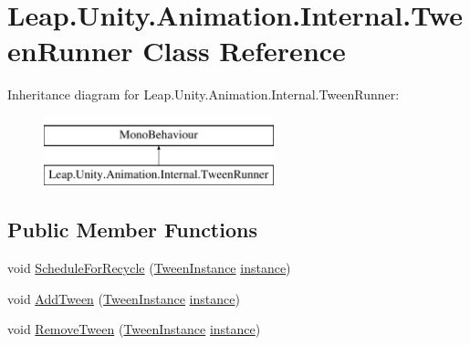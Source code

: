 \hypertarget{class_leap_1_1_unity_1_1_animation_1_1_internal_1_1_tween_runner}{}\section{Leap.\+Unity.\+Animation.\+Internal.\+Tween\+Runner Class Reference}
\label{class_leap_1_1_unity_1_1_animation_1_1_internal_1_1_tween_runner}
Inheritance diagram for Leap.\+Unity.\+Animation.\+Internal.\+Tween\+Runner\+:\begin{figure}[H]
\begin{center}
\leavevmode
\includegraphics[height=2.000000cm]{class_leap_1_1_unity_1_1_animation_1_1_internal_1_1_tween_runner}
\end{center}
\end{figure}
\subsection*{Public Member Functions}
\begin{DoxyCompactItemize}
\item 
void \mbox{\hyperlink{class_leap_1_1_unity_1_1_animation_1_1_internal_1_1_tween_runner_a7328229bb7b6f35e7244084c089ccc58}{Schedule\+For\+Recycle}} (\mbox{\hyperlink{class_leap_1_1_unity_1_1_animation_1_1_internal_1_1_tween_instance}{Tween\+Instance}} \mbox{\hyperlink{class_leap_1_1_unity_1_1_animation_1_1_internal_1_1_tween_runner_a17b39765b051fa31558883ada29043fc}{instance}})
\item 
void \mbox{\hyperlink{class_leap_1_1_unity_1_1_animation_1_1_internal_1_1_tween_runner_aba1606d61c642a3122bce4426ada3546}{Add\+Tween}} (\mbox{\hyperlink{class_leap_1_1_unity_1_1_animation_1_1_internal_1_1_tween_instance}{Tween\+Instance}} \mbox{\hyperlink{class_leap_1_1_unity_1_1_animation_1_1_internal_1_1_tween_runner_a17b39765b051fa31558883ada29043fc}{instance}})
\item 
void \mbox{\hyperlink{class_leap_1_1_unity_1_1_animation_1_1_internal_1_1_tween_runner_ab415e5b8744f8fef7b33d4d01cad6e54}{Remove\+Tween}} (\mbox{\hyperlink{class_leap_1_1_unity_1_1_animation_1_1_internal_1_1_tween_instance}{Tween\+Instance}} \mbox{\hyperlink{class_leap_1_1_unity_1_1_animation_1_1_internal_1_1_tween_runner_a17b39765b051fa31558883ada29043fc}{instance}})
\end{DoxyCompactItemize}

